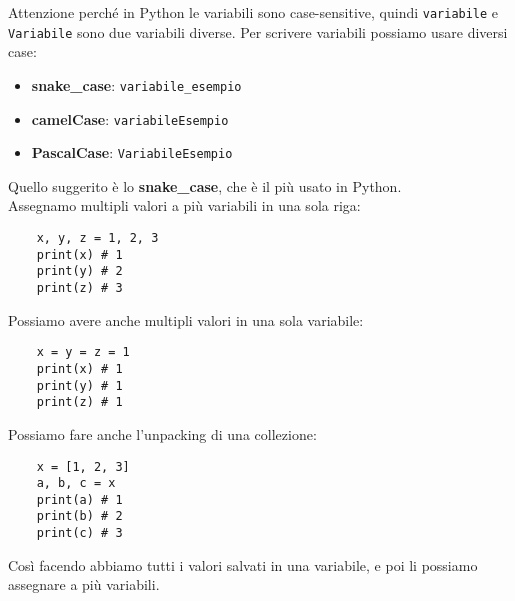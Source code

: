 \documentclass[a4paper,12pt]{article}
\begin{document}
Attenzione perché in Python le variabili sono case-sensitive, quindi \texttt{variabile} e \texttt{Variabile} sono due variabili diverse.
Per scrivere variabili possiamo usare diversi case:
\begin{itemize}
    \item \textbf{snake\_case}: \texttt{variabile\_esempio}
    \item \textbf{camelCase}: \texttt{variabileEsempio}
    \item \textbf{PascalCase}: \texttt{VariabileEsempio}
\end{itemize}
Quello suggerito è lo \textbf{snake\_case}, che è il più usato in Python.\\
Assegnamo multipli valori a più variabili in una sola riga:
\begin{lstlisting}
    x, y, z = 1, 2, 3
    print(x) # 1
    print(y) # 2
    print(z) # 3
\end{lstlisting}
\vspace{1em}
Possiamo avere anche multipli valori in una sola variabile:
\begin{lstlisting}
    x = y = z = 1
    print(x) # 1
    print(y) # 1
    print(z) # 1
\end{lstlisting}
\vspace{1em}
Possiamo fare anche l'unpacking di una collezione:
\begin{lstlisting}
    x = [1, 2, 3]
    a, b, c = x
    print(a) # 1
    print(b) # 2
    print(c) # 3
\end{lstlisting}
Così facendo abbiamo tutti i valori salvati in una variabile, e poi li possiamo assegnare a più variabili.
\vspace{1em}
\newpage
\end{document}
